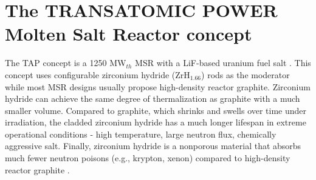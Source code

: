 \documentclass[12pt]{article} %
\begin{document}
\section{The TRANSATOMIC POWER Molten Salt Reactor concept}
The \gls{TAP} concept is a 1250 MW$_{th}$ \gls{MSR} with a LiF-based uranium 
fuel salt \cite{transatomic_power_corporation_technical_2016}. This concept 
uses configurable zirconium hydride (ZrH$_{1.66}$) rods as the moderator while 
most \gls{MSR} designs usually propose high-density reactor graphite. 
Zirconium hydride can achieve the same degree of thermalization as graphite 
with a much smaller volume. Compared to graphite, which shrinks and swells 
over time under irradiation, the cladded zirconium hydride has a much 
longer lifespan in extreme operational conditions - high temperature, large 
neutron flux, chemically aggressive salt. Finally, zirconium hydride is a 
nonporous material that absorbs much fewer neutron poisons (e.g., krypton, 
xenon) compared to high-density reactor graphite 
\cite{transatomic_power_corporation_technical_2016, 
transatomic_power_corporation_neutronics_2016, betzler_two-dimensional_2016}.
\end{document}
